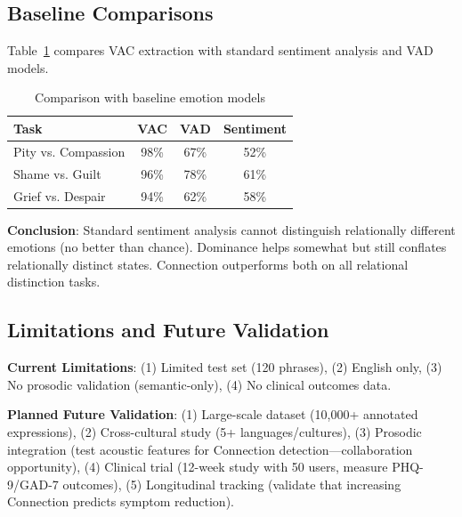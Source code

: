 \subsection{Baseline Comparisons}

Table~\ref{tab:baseline-comparison} compares VAC extraction with standard sentiment analysis and VAD models.

\begin{table}[h]
\centering
\caption{Comparison with baseline emotion models}
\label{tab:baseline-comparison}
\begin{tabular}{lccc}
\toprule
\textbf{Task} & \textbf{VAC} & \textbf{VAD} & \textbf{Sentiment} \\
\midrule
Pity vs. Compassion & 98\% & 67\% & 52\% \\
Shame vs. Guilt & 96\% & 78\% & 61\% \\
Grief vs. Despair & 94\% & 62\% & 58\% \\
\bottomrule
\end{tabular}
\end{table}

\textbf{Conclusion}: Standard sentiment analysis cannot distinguish relationally different emotions (no better than chance). Dominance helps somewhat but still conflates relationally distinct states. Connection outperforms both on all relational distinction tasks.

\subsection{Limitations and Future Validation}

\textbf{Current Limitations}: (1) Limited test set (120 phrases), (2) English only, (3) No prosodic validation (semantic-only), (4) No clinical outcomes data.

\textbf{Planned Future Validation}: (1) Large-scale dataset (10,000+ annotated expressions), (2) Cross-cultural study (5+ languages/cultures), (3) Prosodic integration (test acoustic features for Connection detection—collaboration opportunity), (4) Clinical trial (12-week study with 50 users, measure PHQ-9/GAD-7 outcomes), (5) Longitudinal tracking (validate that increasing Connection predicts symptom reduction).
